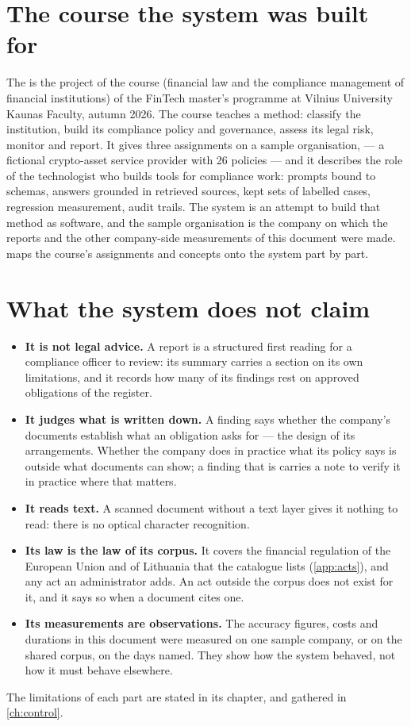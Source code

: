 \section{The course the system was built for}\label{sec:intro:course}

The \product{} is the project of the course  (financial law and the compliance management of financial institutions)
of the FinTech master's programme at Vilnius University Kaunas Faculty, autumn 2026. The course
teaches a method: classify the institution, build its compliance policy and governance, assess
its legal risk, monitor and report. It gives three assignments on a sample organisation,
\demo{} --- a fictional crypto-asset service provider with 26 policies --- and it describes
the role of the technologist who builds tools for compliance work: prompts bound to schemas,
answers grounded in retrieved sources, kept sets of labelled cases, regression measurement,
audit trails. The system is an attempt to build that method as software, and the sample
organisation is the company on which the reports and the other company-side measurements of
this document were made.
 maps the course's assignments and concepts onto the system part by part.

\section{What the system does not claim}\label{sec:intro:limits}

\begin{itemize}
  \item \textbf{It is not legal advice.} A report is a structured first reading for a
    compliance officer to review: its summary carries a section on its own limitations, and it
    records how many of its findings rest on approved obligations of the register.
  \item \textbf{It judges what is written down.} A finding says whether the company's documents
    establish what an obligation asks for --- the design of its arrangements. Whether the
    company does in practice what its policy says is outside what documents can show; a
    finding that is  carries a note to verify it in practice where that matters.
  \item \textbf{It reads text.} A scanned document without a text layer gives it nothing to
    read: there is no optical character recognition.
  \item \textbf{Its law is the law of its corpus.} It covers the financial regulation of
    the European Union and of Lithuania that the catalogue lists (\cref{app:acts}), and any
    act an administrator adds. An act outside the corpus does not exist for it, and it says
    so when a document cites one.
  \item \textbf{Its measurements are observations.} The accuracy figures, costs and durations
    in this document were measured on one sample company, or on the shared corpus, on the days
    named. They show how the
    system behaved, not how it must behave elsewhere.
\end{itemize}

The limitations of each part are stated in its chapter, and gathered in \cref{ch:control}.

